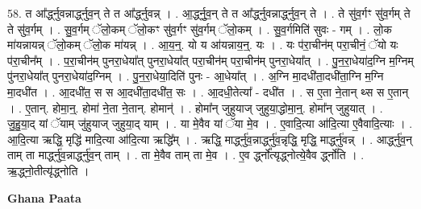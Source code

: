 \documentclass[17pt]{extarticle}
\begin{document}
58. त आ᳚र्द्ध्नुवन्नार्द्ध्नुव॒न् ते त आ᳚र्द्ध्नुवन्न् । . आ॒र्द्ध्नु॒व॒न् ते त आ᳚र्द्ध्नुवन्नार्द्ध्नुव॒न् ते । . ते सु॑व॒र्गꣳ सु॑व॒र्गम् ते ते सु॑व॒र्गम् । . सु॒व॒र्गम् ॅलो॒कम् ॅलो॒कꣳ सु॑व॒र्गꣳ सु॑व॒र्गम् ॅलो॒कम् । . सु॒व॒र्गमिति॑ सुवः - गम् । . लो॒क मा॑यन्नायन्न् ॅलो॒कम् ॅलो॒क मा॑यन्न् । . आ॒य॒न्॒. यो य आ॑यन्नाय॒न्॒. यः । . यः प॑रा॒चीन॑म् परा॒चीनं॒ ॅयो यः प॑रा॒चीन᳚म् । . प॒रा॒चीन॑म् पुनरा॒धेया᳚त् पुनरा॒धेया᳚त् परा॒चीन॑म् परा॒चीन॑म् पुनरा॒धेया᳚त् । . पु॒न॒रा॒धेया॑द॒ग्नि म॒ग्निम् पु॑नरा॒धेया᳚त् पुनरा॒धेया॑द॒ग्निम् । . पु॒न॒रा॒धेया॒दिति॑ पुनः - आ॒धेया᳚त् । . अ॒ग्नि मा॒दधी॑ता॒दधी॑ता॒ग्नि म॒ग्नि मा॒दधी॑त । . आ॒दधी॑त॒ स स आ॒दधी॑ता॒दधी॑त॒ सः । . आ॒दधी॒तेत्या᳚ - दधी॑त । . स ए॒ता ने॒तान् थ्स स ए॒तान् । . ए॒तान्. होमा॒न्॒. होमा॑ ने॒ता ने॒तान्. होमान्॑ । . होमा᳚न् जुहुयाज् जुहुया॒द्धोमा॒न्॒. होमा᳚न् जुहुयात् । . जु॒हु॒या॒द् यां ॅयाम् जु॑हुयाज् जुहुया॒द् याम् । . या मे॒वैव यां ॅया मे॒व । . ए॒वादि॒त्या आ॑दि॒त्या ए॒वैवादि॒त्याः । . आ॒दि॒त्या ऋद्धि॒ मृद्धि॑ मादि॒त्या आ॑दि॒त्या ऋद्धि᳚म् । . ऋद्धि॒ मार्द्ध्नु॑व॒न्नार्द्ध्नु॑व॒न्नृद्धि॒ मृद्धि॒ मार्द्ध्नु॑वन्न् । . आर्द्ध्नु॑व॒न् ताम् ता मार्द्ध्नु॑व॒न्नार्द्ध्नु॑व॒न् ताम् । . ता मे॒वैव ताम् ता मे॒व । . ए॒व र्द्ध्नो᳚त्यृद्ध्नोत्ये॒वैव र्द्ध्नो॑ति । . ऋ॒द्ध्नो॒तीत्यृ॑द्ध्नोति । \newline

\textbf{Ghana Paata } \newline
\end{document}
